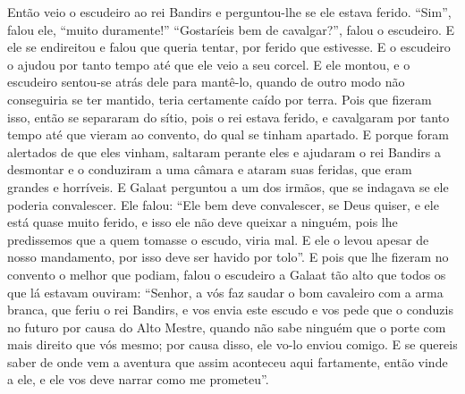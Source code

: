 Então veio o escudeiro ao rei Bandirs e perguntou-lhe se ele estava ferido.
“Sim”, falou ele, “muito duramente!” “Gostaríeis bem de cavalgar?”, falou o
escudeiro. E ele se endireitou e falou que queria tentar, por ferido que
estivesse. E o escudeiro o ajudou por tanto tempo até que ele veio a seu
corcel. E ele montou, e o escudeiro sentou-se atrás dele para mantê-lo, quando
de outro modo não conseguiria se ter mantido, teria certamente caído por terra.
Pois que fizeram isso, então se separaram do sítio, pois o rei estava ferido, e
cavalgaram por tanto tempo até que vieram ao convento, do qual se tinham
apartado. E porque foram alertados de que eles vinham, saltaram perante eles e
ajudaram o rei Bandirs a desmontar e o conduziram a uma câmara e ataram suas
feridas, que eram grandes e horríveis. E Galaat perguntou a um dos irmãos, que
se indagava se ele poderia convalescer. Ele falou: “Ele bem deve convalescer,
se Deus quiser, e ele está quase muito ferido, e isso ele não deve queixar a
ninguém, pois lhe predissemos que a quem tomasse o escudo, viria mal. E ele
o levou apesar de nosso mandamento, por isso deve ser havido por tolo”. E pois
que lhe fizeram no convento o melhor que podiam, falou o escudeiro a Galaat tão
alto que todos os que lá estavam ouviram: “Senhor, a vós faz saudar o bom
cavaleiro com a arma branca, que feriu o rei Bandirs, e vos envia este escudo e
vos pede que o conduzis no futuro por causa do Alto Mestre, quando não sabe
ninguém que o porte com mais direito que vós mesmo; por causa disso, ele vo-lo
enviou comigo. E se quereis saber de onde vem a aventura que assim aconteceu
aqui fartamente, então vinde a ele, e ele vos deve narrar como me prometeu”.  

